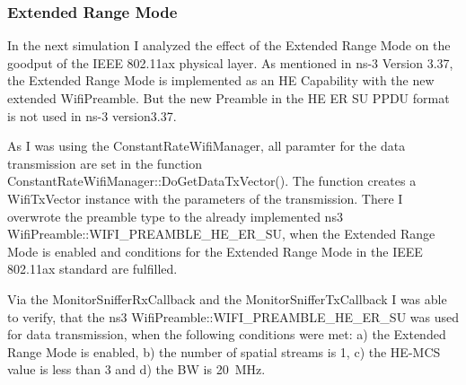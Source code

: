 \subsubsection*{Extended Range Mode}

In the next simulation I analyzed the effect of the Extended Range Mode on the goodput of the IEEE 802.11ax physical layer.
As mentioned in ns-3 Version 3.37, the Extended Range Mode is implemented as an HE Capability with the new extended WifiPreamble.
But the new Preamble in the HE ER SU PPDU format is not used in ns-3 version3.37.

As I was using the ConstantRateWifiManager, all paramter  for the data transmission are set in the function
ConstantRateWifiManager::DoGetDataTxVector(). The function creates a WifiTxVector instance with the parameters of the
transmission. There I overwrote the preamble type to the already implemented ns3 WifiPreamble::WIFI\_PREAMBLE\_HE\_ER\_SU, when
the Extended Range Mode is enabled and conditions for the Extended Range Mode in the IEEE 802.11ax standard \cite{noauthor_ieee_2021} are fulfilled.

Via the MonitorSnifferRxCallback and the MonitorSnifferTxCallback I was able to verify, that the ns3 WifiPreamble::WIFI\_PREAMBLE\_HE\_ER\_SU was used
for data transmission, when the following conditions were met: a) the Extended Range Mode is enabled, b) the number of spatial streams is \num{1}, c) the HE-\ac{MCS} value is less than \num{3} and
d) the \ac{BW} is \SI{20}{\mega\hertz}.


